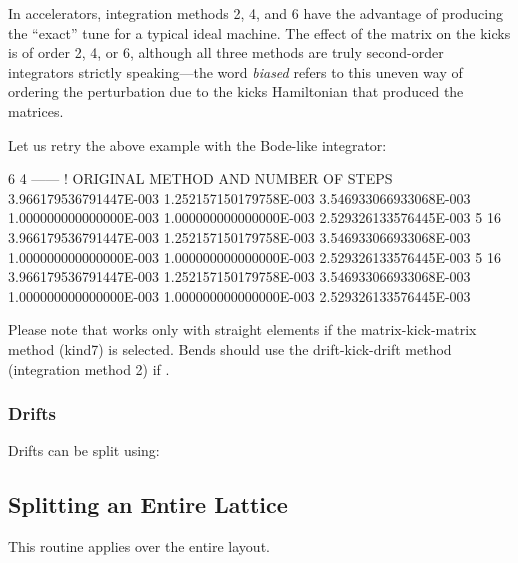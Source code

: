 In accelerators, integration methods 2, 4, and 6 have the advantage of producing
the ``exact'' tune for a typical ideal machine. The effect of the matrix on the kicks is
of order 2, 4, or 6, although all three methods are truly second-order integrators
strictly speaking---the word \emph{biased} refers to this uneven way of ordering
the perturbation due to the kicks Hamiltonian that produced the matrices.

Let us retry the above example with the Bode-like integrator:

\begin{ptccode}
     6      4     ------ ! ORIGINAL METHOD AND NUMBER OF STEPS
3.966179536791447E-003  1.252157150179758E-003  3.546933066933068E-003
1.000000000000000E-003  1.000000000000000E-003  2.529326133576445E-003
     5     16
3.966179536791447E-003  1.252157150179758E-003  3.546933066933068E-003
1.000000000000000E-003  1.000000000000000E-003  2.529326133576445E-003
     5     16
3.966179536791447E-003  1.252157150179758E-003  3.546933066933068E-003
1.000000000000000E-003  1.000000000000000E-003  2.529326133576445E-003
\end{ptccode}

Please note that  works only with straight elements if the matrix-kick-matrix
method (kind7) is selected. Bends should use the drift-kick-drift method (integration method 2) if
 .
 


\subsubsection{Drifts}

%
Drifts can be split using:



\subsection{Splitting an Entire Lattice}

%
This routine applies  over the entire layout.





\endinput
